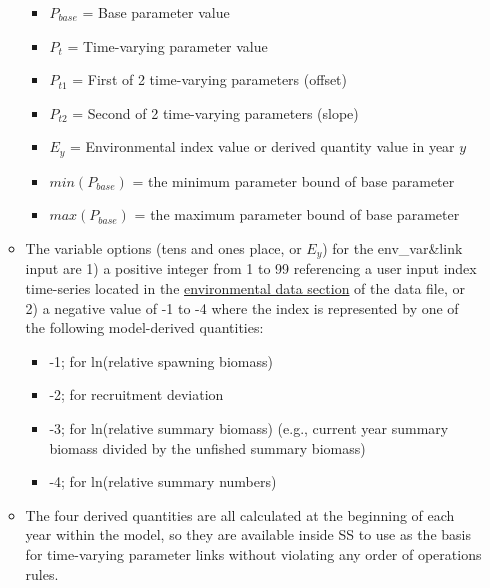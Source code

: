 \begin{itemize}
\begin{itemize}
\begin{itemize}
           \item $P_{base}$ = Base parameter value
           \item $P_{t}$ = Time-varying parameter value
           \item $P_{t1}$ = First of 2 time-varying parameters (offset)
           \item $P_{t2}$ = Second of 2 time-varying parameters (slope)
           \item $E_{y}$ = Environmental index value or derived quantity value in year $y$
           \item $min(P_{base})$ = the minimum parameter bound of base parameter
           \item $max(P_{base})$ = the maximum parameter bound of base parameter
        \end{itemize}
		\item The variable options (tens and ones place, or $E_{y}$) for the env\_var\&link input are 1) a positive integer from 1 to 99 referencing a user input index time-series located in the \hyperlink{env-dat}{environmental data section} of the data file, or 2) a negative value of -1 to -4 where the index is represented by one of the following model-derived quantities:
		\begin{itemize}
			\item -1;  for ln(relative spawning biomass)
			\item -2;  for recruitment deviation
			\item -3;  for ln(relative summary biomass) (e.g., current year summary biomass divided by the unfished summary biomass)
			\item -4;  for ln(relative summary numbers)
		\end{itemize}
		\item The four derived quantities are all calculated at the beginning of each year within the model, so they are available inside SS to use as the basis for time-varying parameter links without violating any order of operations rules.
	\end{itemize}
	

\end{itemize}
